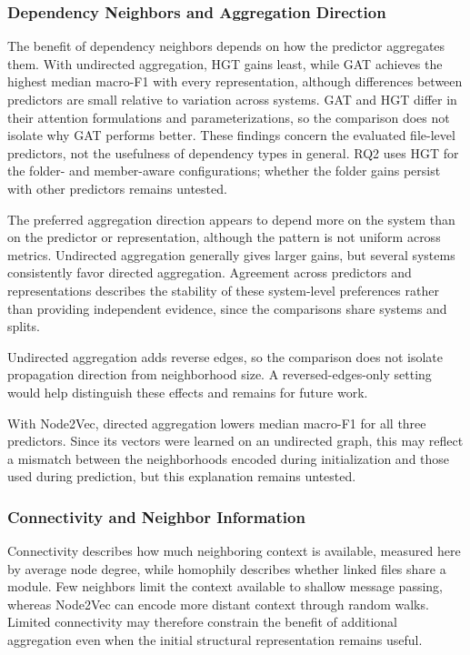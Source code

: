 \subsubsection*{Dependency Neighbors and Aggregation Direction}

The benefit of dependency neighbors depends on how the predictor aggregates them. With undirected aggregation, HGT gains least, while GAT achieves the highest median macro-F1 with every representation, although differences between predictors are small relative to variation across systems. GAT and HGT differ in their attention formulations and parameterizations, so the comparison does not isolate why GAT performs better. These findings concern the evaluated file-level predictors, not the usefulness of dependency types in general. RQ2 uses HGT for the folder- and member-aware configurations; whether the folder gains persist with other predictors remains untested.

The preferred aggregation direction appears to depend more on the system than on the predictor or representation, although the pattern is not uniform across metrics. Undirected aggregation generally gives larger gains, but several systems consistently favor directed aggregation. Agreement across predictors and representations describes the stability of these system-level preferences rather than providing independent evidence, since the comparisons share systems and splits.

Undirected aggregation adds reverse edges, so the comparison does not isolate propagation direction from neighborhood size. A reversed-edges-only setting would help distinguish these effects and remains for future work.

With Node2Vec, directed aggregation lowers median macro-F1 for all three predictors. Since its vectors were learned on an undirected graph, this may reflect a mismatch between the neighborhoods encoded during initialization and those used during prediction, but this explanation remains untested.

\subsubsection*{Connectivity and Neighbor Information}
Connectivity describes how much neighboring context is available, measured here by average node degree, while homophily describes whether linked files share a module. Few neighbors limit the context available to shallow message passing, whereas Node2Vec can encode more distant context through random walks. Limited connectivity may therefore constrain the benefit of additional aggregation even when the initial structural representation remains useful.

